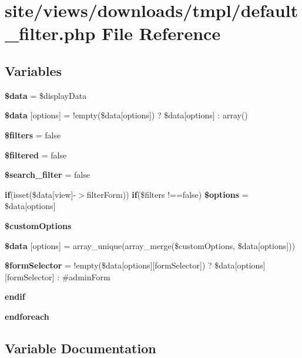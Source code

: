 \section{site/views/downloads/tmpl/default\+\_\+filter.php File Reference}
\label{downloads_2tmpl_2default__filter_8php}
\subsection*{Variables}
\begin{DoxyCompactItemize}
\item 
\textbf{ \$data} = \$display\+Data
\item 
\textbf{ \$data} [\textquotesingle{}options\textquotesingle{}] = !empty(\$data[\textquotesingle{}options\textquotesingle{}]) ? \$data[\textquotesingle{}options\textquotesingle{}] \+: array()
\item 
\textbf{ \$filters} = false
\item 
\textbf{ \$filtered} = false
\item 
\textbf{ \$search\+\_\+filter} = false
\item 
\textbf{ if}(isset(\$data[\textquotesingle{}view\textquotesingle{}]-\/$>$filter\+Form)) \textbf{ if}(\$filters !==false) \textbf{ \$options} = \$data[\textquotesingle{}options\textquotesingle{}]
\item 
\textbf{ \$custom\+Options}
\item 
\textbf{ \$data} [\textquotesingle{}options\textquotesingle{}] = array\+\_\+unique(array\+\_\+merge(\$custom\+Options, \$data[\textquotesingle{}options\textquotesingle{}]))
\item 
\textbf{ \$form\+Selector} = !empty(\$data[\textquotesingle{}options\textquotesingle{}][\textquotesingle{}form\+Selector\textquotesingle{}]) ? \$data[\textquotesingle{}options\textquotesingle{}][\textquotesingle{}form\+Selector\textquotesingle{}] \+: \textquotesingle{}\#admin\+Form\textquotesingle{}
\item 
\textbf{ endif}
\item 
\textbf{ endforeach}
\end{DoxyCompactItemize}


\subsection{Variable Documentation}
\mbox{\label{downloads_2tmpl_2default__filter_8php_a7d18ae670dcf541080205f54f2caa414}} 
